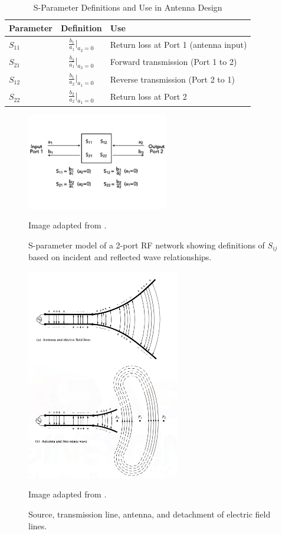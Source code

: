 \begin{table}[H]
\centering
\caption{S-Parameter Definitions and Use in Antenna Design}
\begin{tabular}{lcl}
\toprule
\textbf{Parameter} & \textbf{Definition} & \textbf{Use} \\
\midrule
$S_{11}$ & $\frac{b_1}{a_1} \Big|_{a_2 = 0}$ & Return loss at Port 1 (antenna input) \\
$S_{21}$ & $\frac{b_2}{a_1} \Big|_{a_2 = 0}$ & Forward transmission (Port 1 to 2) \\
$S_{12}$ & $\frac{b_1}{a_2} \Big|_{a_1 = 0}$ & Reverse transmission (Port 2 to 1) \\
$S_{22}$ & $\frac{b_2}{a_2} \Big|_{a_1 = 0}$ & Return loss at Port 2 \\
\bottomrule
\end{tabular}
\end{table}

\begin{figure}[H]
\centering
\includegraphics[width=0.55\textwidth]{figures/s11.jpg}
\caption{S-parameter model of a 2-port RF network showing definitions of $S_{ij}$ based on incident and reflected wave relationships.}
\small Image adapted from \cite{microwavejournal_sparams}.
\label{fig:sparams}
\end{figure}

\begin{figure}[H]
    \centering
    \includegraphics[width=0.6\textwidth]{figures/radiation.png}
    \caption{Source, transmission line, antenna, and detachment of electric field lines.}
    \small Image adapted from \cite{balanis}.
    \label{fig:radiation-overview}
\end{figure}

